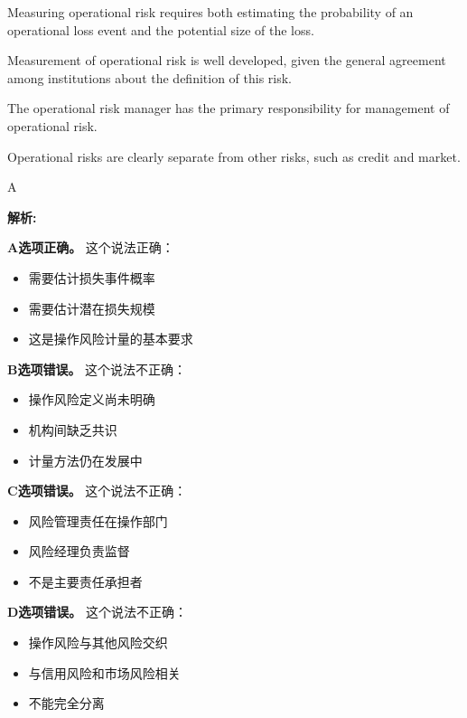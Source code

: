\documentclass{article}
\newenvironment{explanation}
{\textbf{解析:}\par}
{\par}
\begin{document}
\begin{choices}
    \item Measuring operational risk requires both estimating the probability of an operational loss event and the potential size of the loss.
    \item Measurement of operational risk is well developed, given the general agreement among institutions about the definition of this risk.
    \item The operational risk manager has the primary responsibility for management of operational risk.
    \item Operational risks are clearly separate from other risks, such as credit and market.
\end{choices}

\begin{correctanswer}
    A
\end{correctanswer}

\begin{explanation}
    \textbf{A选项正确。}
    这个说法正确：
    \begin{itemize}
        \item 需要估计损失事件概率
        \item 需要估计潜在损失规模
        \item 这是操作风险计量的基本要求
    \end{itemize}

    \textbf{B选项错误。}
    这个说法不正确：
    \begin{itemize}
        \item 操作风险定义尚未明确
        \item 机构间缺乏共识
        \item 计量方法仍在发展中
    \end{itemize}

    \textbf{C选项错误。}
    这个说法不正确：
    \begin{itemize}
        \item 风险管理责任在操作部门
        \item 风险经理负责监督
        \item 不是主要责任承担者
    \end{itemize}

    \textbf{D选项错误。}
    这个说法不正确：
    \begin{itemize}
        \item 操作风险与其他风险交织
        \item 与信用风险和市场风险相关
        \item 不能完全分离
    \end{itemize}
\end{explanation}
\end{document}

